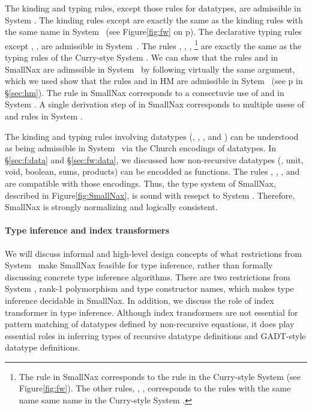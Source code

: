 The kinding and typing rules, except those rules for datatypes, are admissible
in System \Fw. The kinding rules except  are exactly the same as
the kinding rules with the same name in System \Fw\ (see Figure\;\ref{fig:fw}
on p\pageref{fig:fw}). The declarative typing rules except ,
,  are admissible in System~\Fw. The rules
, , , \footnote{
	The  rule in SmallNax corresponds to
	the  rule in the Curry-style System \Fw
	(see Figure\;\ref{fig:fw}). The other rules, ,
	,  corresponds to the rules with
	the same name same name in the Curry-style System \Fw. }
are exactly the same as the typing rules of the Curry-stye System \Fw.
We can show that the rules  and  in SmallNax are
adimssible in System \Fw\ by following virtually the same argument, which
we used show that the rules  and  in HM are
admissible in Sytem \F\ (see p\pageref{hm:LetAdmissibleFw} in \S\ref{sec:hm}).
The  rule in SmallNax corresponds to a consectuvie use of
 and  in System \Fw. A single derivation step of
 in SmallNax corresponds to multiple usese of 
and  rules in System \Fw.

The kinding and typing rules involving datatypes (,
, , and ) can be understood as
being admissible in System \Fw\ via the Church encodings of datatypes.
In \S\ref{sec:f:data} and \S\ref{sec:fw:data}, we discussed
how non-recursive datatypes (\eg, unit, void, boolean, sums, products) can
be encodded as functions. The rules , ,
, and  are compatible with those encodings.
Thus, the type system of SmallNax, described in Figure\;\ref{fig:SmallNax},
is sound with resepct to System \Fw.
Therefore, SmallNax is strongly normalizing and logically consistent.

\paragraph{Type inference and index transformers}
We will discuss informal and high-level design concepts of what restrictions
from System \Fw\ make SmallNax feasible for type inference, rather than
formally discussing concrete type inference algorithms. There are two
restrictions from System \Fw, rank-1 polymorphism and type constructor names,
which makes type inference decidable in SmallNax. In addition, we discuss
the role of index transformer in type inference. Although index transformers
are not essential for pattern matching of datatypes defined by non-recursive
equations, it does play essential roles in inferring types of recursive
datatype definitions and GADT-style datatype definitions.

